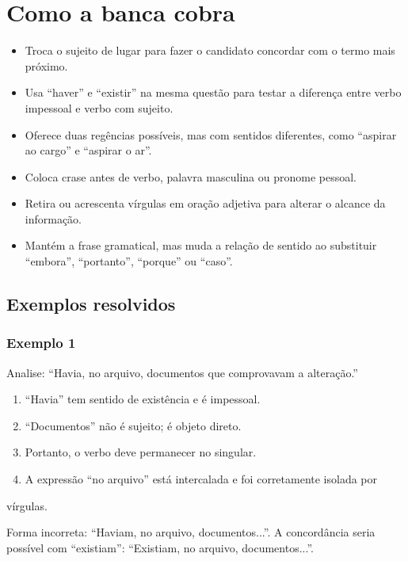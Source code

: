\documentclass[11pt,a4paper]{article}
\begin{document}
\section*{Como a banca cobra}

\begin{itemize}
  \item Troca o sujeito de lugar para fazer o candidato concordar com o termo mais próximo.
  \item Usa “haver” e “existir” na mesma questão para testar a diferença entre verbo impessoal e verbo com sujeito.
  \item Oferece duas regências possíveis, mas com sentidos diferentes, como “aspirar ao cargo” e “aspirar o ar”.
  \item Coloca crase antes de verbo, palavra masculina ou pronome pessoal.
  \item Retira ou acrescenta vírgulas em oração adjetiva para alterar o alcance da informação.
  \item Mantém a frase gramatical, mas muda a relação de sentido ao substituir “embora”, “portanto”, “porque” ou “caso”.
\end{itemize}

\subsection*{Exemplos resolvidos}

\subsubsection*{Exemplo 1}

Analise: “Havia, no arquivo, documentos que comprovavam a alteração.”

\begin{enumerate}
  \item “Havia” tem sentido de existência e é impessoal.
  \item “Documentos” não é sujeito; é objeto direto.
  \item Portanto, o verbo deve permanecer no singular.
  \item A expressão “no arquivo” está intercalada e foi corretamente isolada por
\end{enumerate}

   vírgulas.

Forma incorreta: “Haviam, no arquivo, documentos...”. A concordância seria possível com “existiam”: “Existiam, no arquivo, documentos...”.
\end{document}
